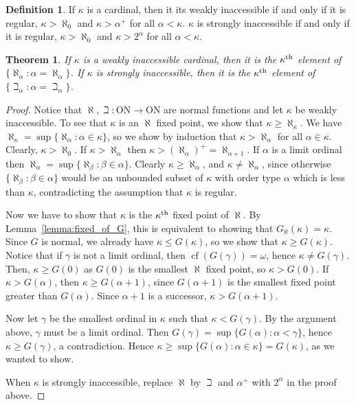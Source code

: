 \documentclass{report}
\newtheorem{theorem}{Theorem}[section]
\theoremstyle{definition}
\newtheorem{definition}{Definition}[section]
\theoremstyle{remark}
\newcommand{\set}[1]{\{#1\}}
\DeclareMathOperator{\cf}{cf}
\begin{document}
\begin{definition}
    If $\kappa$ is a cardinal, then it its weakly inaccessible if and only if it is regular, $\kappa > \aleph_0$ and $\kappa >\alpha^+$ for all $\alpha < \kappa$. $\kappa$ is strongly inaccessible if and only if it is regular, $\kappa > \aleph_0$ and $\kappa > 2^\alpha$ for all $\alpha < \kappa$.
\end{definition}

\begin{theorem}
    If $\kappa$ is a weakly inaccessible cardinal, then it is the $\kappa\textsuperscript{th}$ element of $\set{\aleph_\alpha : \alpha = \aleph_\alpha}$. If $\kappa$ is strongly inaccessible, then it is the $\kappa\textsuperscript{th}$ element of $\set{\beth_\alpha : \alpha = \beth_\alpha}$.
\end{theorem}

\begin{proof}
    Notice that $\aleph, \beth : \mathrm{ON} \to \mathrm{ON}$ are normal functions and let $\kappa$ be weakly inaccessible. To see that $\kappa$ is an $\aleph$ fixed point, we show that $\kappa \geq \aleph_\kappa$. We have $\aleph_\kappa = \sup\set{\aleph_\alpha : \alpha \in \kappa}$, so we show by induction that $\kappa > \aleph_\alpha$ for all $\alpha \in \kappa$. Clearly, $\kappa > \aleph_0$. If $\kappa > \aleph_\alpha$ then $\kappa > (\aleph_\alpha)^+ = \aleph_{\alpha + 1}$. If $\alpha$ is a limit ordinal then $\aleph_\alpha = \sup\set{\aleph_\beta : \beta \in \alpha}$. Clearly $\kappa \geq \aleph_\alpha$, and $\kappa \neq \aleph_\alpha$, since otherwise $\set{\aleph_\beta : \beta \in \alpha}$ would be an unbounded subset of $\kappa$ with order type $\alpha$ which is less than $\kappa$, contradicting the assumption that $\kappa$ is regular.
    
    Now we have to show that $\kappa$ is the $\kappa\textsuperscript{th}$ fixed point of $\aleph$. By Lemma~\ref{lemma:fixed_of_G}, this is equivalent to showing that $G_\aleph(\kappa) = \kappa$. Since $G$ is normal, we already have $\kappa \leq G(\kappa)$, so we show that $\kappa \geq G(\kappa)$. Notice that if $\gamma$ is not a limit ordinal, then $\cf (G(\gamma)) = \omega$, hence $\kappa \neq G(\gamma)$. Then, $\kappa \geq G(0)$ as $G(0)$ is the smallest $\aleph$ fixed point, so $\kappa > G(0)$. If $\kappa > G(\alpha)$, then $\kappa \geq G(\alpha + 1)$, since $G(\alpha + 1)$ is the smallest fixed point greater than $G(\alpha)$. Since $\alpha + 1$ is a successor, $\kappa > G(\alpha + 1)$.
    
    Now let $\gamma$ be the smallest ordinal in $\kappa$ such that $\kappa < G(\gamma)$. By the argument above, $\gamma$ must be a limit ordinal. Then $G(\gamma) = \sup\set{G(\alpha) : \alpha < \gamma}$, hence $\kappa \geq G(\gamma)$, a contradiction. Hence $\kappa \geq \sup\set{G(\alpha) : \alpha \in \kappa} = G(\kappa)$, as we wanted to show.
    
    When $\kappa$ is strongly inaccessible, replace $\aleph$ by $\beth$ and $\alpha^+$ with $2^\alpha$ in the proof above.
\end{proof}
\end{document}
